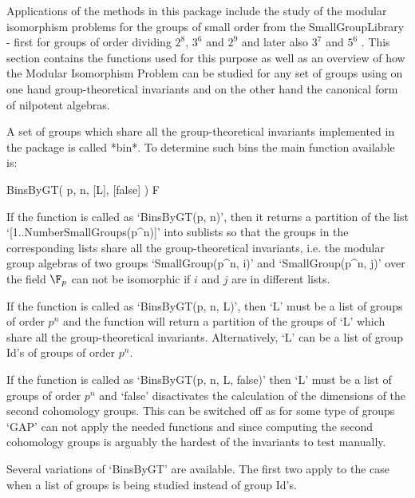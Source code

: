 
Applications of the methods in this package include the study
of the modular isomorphism problems for the groups of small order
from the SmallGroupLibrary - first for groups of order dividing
$2^8$, $3^6$ and $2^9$ \cite{Eic07} \cite{EKo11} and later also $3^7$ and $5^6$
\cite{MM22}.
This section contains the functions used for this purpose as well as an
overview of how the Modular Isomorphism Problem can be studied for any
set of groups using on one hand group-theoretical invariants and on 
the other hand the canonical form of nilpotent algebras. 


A set of groups which share all the group-theoretical invariants implemented
in the package is called *bin*. To determine such bins the main function
available is:

\> BinsByGT( p, n, [L], [false] ) F

If the function is called as `BinsByGT(p, n)', then it returns
a partition of the list `[1..NumberSmallGroups(p^n)]' into 
sublists so that the groups in the corresponding lists share
all the group-theoretical invariants, i.e. the modular group algebras of two groups 
`SmallGroup(p^n, i)' and `SmallGroup(p^n, j)' over the field
$\F_p$ can not be isomorphic if $i$ and $j$ are in different lists. 

If the function is called as `BinsByGT(p, n, L)', then `L' must be a 
list of groups of order $p^n$ and the function will return a partition
of the groups of `L' which share all the group-theoretical invariants.
Alternatively, `L' can be a list of group Id's of groups of order $p^n$.

If the function is called as `BinsByGT(p, n, L, false)' then `L' must be
a list of groups of order $p^n$ and `false' disactivates the calculation
of the dimensions of the second cohomology groups. This can be 
switched off as for some type of groups `GAP' can not apply the needed functions
and since computing the second cohomology groups is arguably the hardest 
of the invariants to test manually.



Several variations of `BinsByGT' are available. The first two
apply to the case when a list of groups is being studied instead of 
group Id's.

